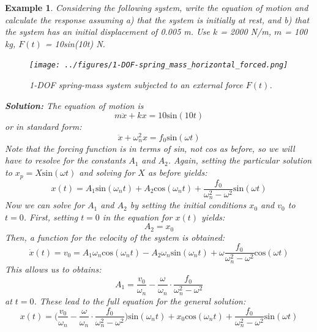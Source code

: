 \documentclass[12pt,letter]{article}
\newtheorem{ex}{Example}
\numberwithin{ex}{section} %
\newenvironment{example}{\begin{mdframed}[middlelinewidth=0.5mm]\begin{ex}\normalfont}{\end{ex}\end{mdframed}}
\numberwithin{re}{section} %
\begin{document}
\begin{example}
			Considering the following system, write the equation of motion and calculate the response assuming a) that the system is initially at rest, and b) that the system has an initial displacement of 0.005 m. Use $k$ = 2000 N/m, $m$ = 100 kg, $F(t)$ = 10sin(10t) N.
			\begin{figure}[H]
				\centering
				\texttt{[image: ../figures/1-DOF-spring\_mass\_horizontal\_forced.png]}
				\caption{1-DOF spring-mass system subjected to an external force $F(t)$.}
			\end{figure}
			\noindent\textbf{Solution:} The equation of motion is
			\begin{equation}
				m\ddot{x}+kx=10\text{sin}(10t)
			\end{equation}
			or in standard form:
			\begin{equation}
				\ddot{x}+\omega_n^2x=f_0\text{sin}(\omega t)
			\end{equation}							
			Note that the forcing function is in terms of sin, not cos as before, so we will have to resolve for the constants $A_1$ and $A_2$. Again, setting the particular solution to $x_p=X\text{sin}(\omega t)$ and solving for $X$ as before yields:
			\begin{equation}
				x(t) = A_1\text{sin}(\omega_n t) + A_2\text{cos}(\omega_n t) + \frac{f_0}{\omega_n^2-\omega^2}\text{sin}(\omega t)
			\end{equation}	
			Now we can solve for $A_1$ and $A_2$ by setting the initial conditions $x_0$ and $v_0$ to $t=0$. First, setting $t=0$ in the equation for $x(t)$ yields:
			\begin{equation}
				A_2 = x_0
			\end{equation}	
			Then, a function for the velocity of the system is obtained: 
			\begin{equation}
				\dot{x}(t) = v_0 = A_1\omega_n\text{cos}(\omega_n t) - A_2\omega_n\text{sin}(\omega_n t) + \omega\frac{f_0}{\omega_n^2-\omega^2}\text{cos}(\omega t)
			\end{equation}				
			This allows us to obtains:
			\begin{equation}
				A_1 = \frac{v_0}{\omega_n}-\frac{\omega}{\omega_n}\cdot \frac{f_0}{\omega_n^2-\omega^2}
			\end{equation}	
			at $t=0$. These lead to the full equation for the general solution:
			\begin{equation}
				x(t) = \Big(\frac{v_0}{\omega_n}-\frac{\omega}{\omega_n}\cdot \frac{f_0}{\omega_n^2-\omega^2}\Big)\text{sin}(\omega_n t) + x_0\text{cos}(\omega_n t) + \frac{f_0}{\omega_n^2-\omega^2}\text{sin}(\omega t)

\end{equation}
\end{example}
\end{document}
